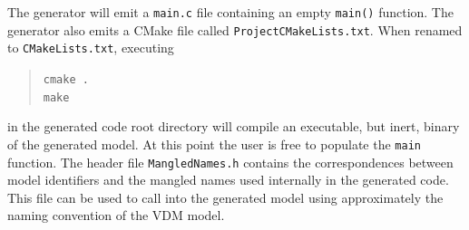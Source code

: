 The generator will emit a \texttt{main.c} file containing an empty \texttt{main()} function.
%
The generator also emits a CMake file called \texttt{Project}\-\texttt{CMake}\-\texttt{Lists.txt}.
%
When renamed to \texttt{CMake}\-\texttt{Lists.txt}, executing
%
%
%
\begin{quote}
\texttt{cmake .}\\
\texttt{make}
\end{quote}
%
%
%
in the generated code root directory will compile an executable, but inert, binary of the generated model.
%
At this point the user is free to populate the \texttt{main} function.
%
The header file \texttt{Mangled}\-\texttt{Names.h} contains the correspondences between model identifiers and the mangled names used internally in the generated code.
%
This file can be used to call into the generated model using approximately the naming convention of the VDM model.
